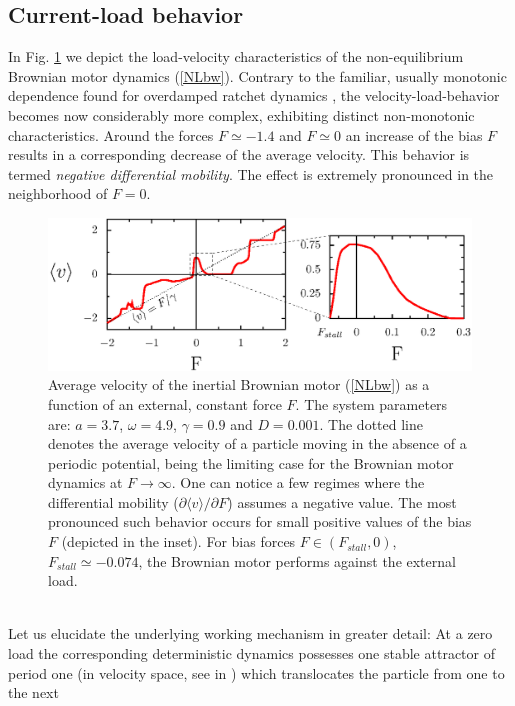 \documentclass{elsart}
\def\la{\langle}
\def\ra{\rangle}
\def\mv{\la v \ra}
\begin{document}
\subsection{Current-load behavior }
\label{num:DNM}
In Fig. \ref{fig1} we depict the load-velocity characteristics of the
non-equilibrium Brownian motor dynamics (\ref{NLbw}). Contrary to the
familiar, usually monotonic dependence found for overdamped ratchet
dynamics \cite{HanBar1996,Bartussek1996,Zapata96}, the
velocity-load-behavior becomes now considerably more complex,
exhibiting distinct non-monotonic characteristics. Around the forces
$F\simeq-1.4$ and $F\simeq{0}$ an increase of the bias $F$ results in
a corresponding decrease of the average velocity. This behavior is
termed {\it negative differential mobility}. The effect is extremely
pronounced in the neighborhood of $F=0$.
%
\label{mobility}
\begin{figure}[htbp]
\centerline{\includegraphics[angle=0,scale=1]{fig1}}
\caption{ %
  Average velocity of the inertial Brownian motor (\ref{NLbw}) as a
  function of an external, constant force $F$. The system parameters
  are: $a=3.7$, $\omega=4.9$, $\gamma=0.9$ and $D=0.001$.  The dotted
  line denotes the average velocity of a particle moving in the
  absence of a periodic potential, being the limiting case for the
  Brownian motor dynamics at $F\to\infty$. One can notice a few
  regimes where the differential mobility ($\partial \mv /\partial F$)
  assumes a negative value.  The most pronounced such behavior occurs
  for small positive values of the bias $F$ (depicted in the inset).
  For bias forces $F \in (F_{stall},0)$, $F_{stall} \simeq -0.074$,
  the Brownian motor performs against the external load.  }
\label{fig1}
\end{figure}
%
\\
Let us elucidate the underlying working mechanism in greater detail:
At a zero load the corresponding deterministic dynamics possesses one
stable attractor of period one (in velocity space, see in
\cite{machura2}) which translocates the particle from one to the next
\end{document}
